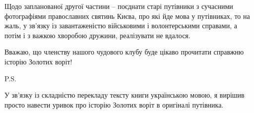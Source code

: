 
Щодо запланованої другої частини – поєднати старі путівники з сучасними
фотографіями православних святинь Києва, про які йде мова у путівниках, то на
жаль, у зв’язку із завантаженістю військовими і волонтерськими справами, а
потім і з важкою хворобою дружини, реалізувати не вдалося. 



Вважаю, що членству нашого чудового клубу буде цікаво прочитати справжню
історію Золотих воріт!

P.S.

У зв’язку із складністю перекладу тексту книги українською мовою, я вирішив
просто навести уривок про історію Золотих воріт в оригіналі путівника.


